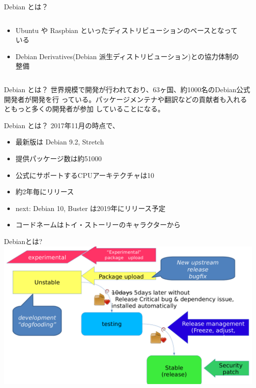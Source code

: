 \documentclass[cjk,c,squeeze,shrink,dvipdfmx,12pt]{beamer}
\begin{document}
\begin{frame}[fragile]{Debian とは？}
  \begin{columns}
    \begin{column}{.58\paperwidth}
      \begin{itemize}
      \item
        Ubuntu や Raspbian といったディストリビューションのベースとなっている
      \item
        Debian Derivatives(Debian 派生ディストリビューション)との協力体制の整備
      \end{itemize}
    \end{column}
    \begin{column}{.4\paperwidth}
      \centering
    \end{column}
  \end{columns}
\end{frame}


\begin{frame}[fragile]{Debian とは？}
 世界規模で開発が行われており、63ヶ国、約1000名のDebian公式開発者が開発を行
 っている。パッケージメンテナや翻訳などの貢献者も入れるともっと多くの開発者が参加
 していることになる。

 \centering
\end{frame}


\begin{frame}[fragile]{Debian とは？}
  2017年11月の時点で、
  \pause
  \begin{itemize}[<+->]
  \item
    最新版は {\alert{Debian 9.2}}, Stretch
  \item
    提供パッケージ数は{\alert{約51000}}
  \item
    公式にサポートするCPUアーキテクチャは{\alert{10}}
  \item {\alert{約2年毎}}にリリース
  \item next: Debian 10, Buster は2019年にリリース予定
  \item コードネームはトイ・ストーリーのキャラクターから
  \end{itemize}
\end{frame}

\begin{frame}[fragile]{Debianとは?}
\centering
\includegraphics[width=.98\textwidth]{image201712/release-cycle.png}
\end{frame}
\end{document}

